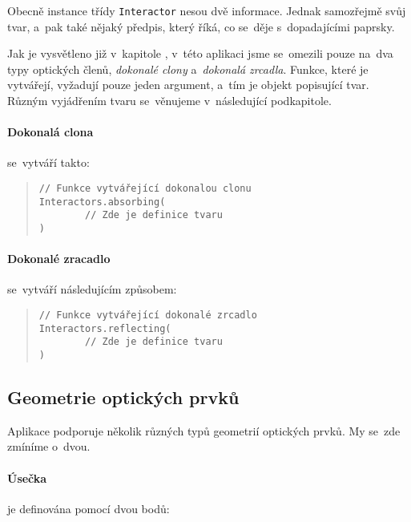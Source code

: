 Obecně instance třídy \texttt{Interactor} nesou dvě informace. Jednak samozřejmě svůj tvar, a~pak také nějaký předpis, který říká, co se~děje s~dopadajícími paprsky.

Jak je vysvětleno již v~kapitole , v~této aplikaci jsme se~omezili pouze na~dva typy optických členů, \emph{dokonalé clony} a~\emph{dokonalá zrcadla}. Funkce, které je vytvářejí, vyžadují pouze jeden argument, a~tím je objekt popisující tvar. Různým vyjádřením tvaru se~věnujeme v~následující podkapitole.

\paragraph{Dokonalá clona} se~vytváří takto:

\begin{minipage}{\textwidth}\begin{quote}\begin{lstlisting}
// Funkce vytvářející dokonalou clonu
Interactors.absorbing(
        // Zde je definice tvaru
)
\end{lstlisting}\end{quote}\end{minipage}
    

\paragraph{Dokonalé zracadlo} se~vytváří následujícím způsobem:

\begin{minipage}{\textwidth}\begin{quote}\begin{lstlisting}
// Funkce vytvářející dokonalé zrcadlo
Interactors.reflecting(
        // Zde je definice tvaru
)
\end{lstlisting}\end{quote}\end{minipage}


\subsection{Geometrie optických prvků}

Aplikace podporuje několik různých typů geometrií optických prvků. My se~zde zmíníme o~dvou.

\paragraph{Úsečka} je definována pomocí dvou bodů:

